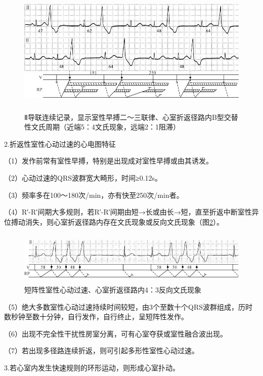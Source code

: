 \begin{figure}[!htbp]
 \centering
 \includegraphics[width=5.59375in,height=2.42708in]{./images/Image00261.jpg}
 \captionsetup{justification=centering}
 \caption{Ⅱ导联连续记录，显示室性早搏二～三联律、心室折返径路内B型交替性文氏周期（近端5：4文氏现象，远端2：1阻滞）}
 \label{fig14-15}
  \end{figure} 

2.折返性室性心动过速的心电图特征

（1）发作前常有室性早搏，特别是出现成对室性早搏或由其诱发。

（2）心动过速的QRS波群宽大畸形，时间≥0.12s。

（3）频率多在100～180次/min，亦有快至250次/min者。

（4）R′-R′间期大多规则，若R′-R′间期由短→长或由长→短，直至折返中断室性异位搏动消失，则心室折返径路内存在文氏现象或反向文氏现象（图\ref{fig14-16}）。

\begin{figure}[!htbp]
 \centering
 \includegraphics[width=5.70833in,height=1in]{./images/Image00262.jpg}
 \captionsetup{justification=centering}
 \caption{短阵性室性心动过速、心室折返径路内4：3反向文氏现象}
 \label{fig14-16}
  \end{figure} 

（5）绝大多数室性心动过速持续时间较短，由3个至数十个QRS波群组成，历时数秒钟至数十分钟，自行发作，自行终止，呈短阵性发作。

（6）出现不完全性干扰性房室分离，可有心室夺获或室性融合波出现。

（7）若出现多径路连续折返，则可引起多形性室性心动过速。

3.若心室内发生快速规则的环形运动，则形成心室扑动。

